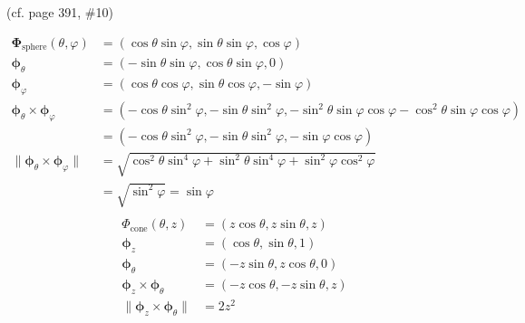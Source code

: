 \documentclass{article}
\newcommand{\norm}[1]{\| #1 \|}
\begin{document}
\begin{enumerate}
\begin{enumerate}
        (cf. page 391, \#10)

        \begin{align*} 
            \boldsymbol \Phi_{\text{sphere}} (\theta, \varphi) &= (\cos \theta \sin \varphi, \sin \theta \sin \varphi, \cos \varphi) \\
            \boldsymbol \phi_{\theta} &= (- \sin \theta \sin \varphi, \cos \theta \sin \varphi, 0)\\
            \boldsymbol \phi_{\varphi} &= (\cos \theta \cos \varphi, \sin \theta \cos \varphi, -\sin \varphi) \\
            \boldsymbol \phi_\theta \times \boldsymbol \phi_\varphi &= (-\cos\theta \sin^2\varphi, -\sin\theta \sin^2\varphi, - \sin^2\theta \sin\varphi \cos\varphi - \cos^2\theta \sin \varphi \cos \varphi) \\ 
            &= (-\cos\theta \sin^2\varphi, -\sin\theta \sin^2\varphi, - \sin\varphi \cos\varphi ) \\ 
            \norm {\boldsymbol \phi_\theta \times \boldsymbol \phi_\varphi} &= \sqrt{\cos^2\theta \sin^4\varphi + \sin^2\theta \sin^4\varphi + \sin^2\varphi \cos^2\varphi } \\ 
            &= \sqrt{\sin^2\varphi } = \sin\varphi \\
        \end{align*}
        \begin{align*} 
            \Phi_{\text{cone}} (\theta, z) &= (z\cos \theta , z\sin \theta, z)  \\
            \boldsymbol \phi_{z} &= (\cos \theta, \sin \theta, 1) \\
            \boldsymbol \phi_{\theta} &= (-z \sin \theta, z\cos \theta, 0) \\
            \boldsymbol \phi_{z} \times \boldsymbol \phi_{\theta} &= (-z\cos \theta, -z\sin \theta, z)  \\
            \norm{\boldsymbol \phi_{z} \times \boldsymbol \phi_{\theta}} &= 2z^2  \\
        \end{align*}
        

\end{enumerate}
\end{enumerate}
\end{document}
